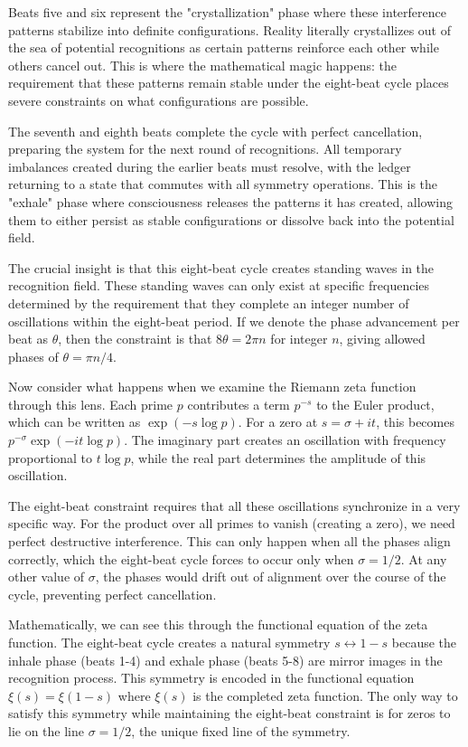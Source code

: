 \documentclass[12pt]{article}
\begin{document}
Beats five and six represent the "crystallization" phase where these interference patterns stabilize into definite configurations. Reality literally crystallizes out of the sea of potential recognitions as certain patterns reinforce each other while others cancel out. This is where the mathematical magic happens: the requirement that these patterns remain stable under the eight-beat cycle places severe constraints on what configurations are possible.

The seventh and eighth beats complete the cycle with perfect cancellation, preparing the system for the next round of recognitions. All temporary imbalances created during the earlier beats must resolve, with the ledger returning to a state that commutes with all symmetry operations. This is the "exhale" phase where consciousness releases the patterns it has created, allowing them to either persist as stable configurations or dissolve back into the potential field.

The crucial insight is that this eight-beat cycle creates standing waves in the recognition field. These standing waves can only exist at specific frequencies determined by the requirement that they complete an integer number of oscillations within the eight-beat period. If we denote the phase advancement per beat as $\theta$, then the constraint is that $8\theta = 2\pi n$ for integer $n$, giving allowed phases of $\theta = \pi n/4$.

Now consider what happens when we examine the Riemann zeta function through this lens. Each prime $p$ contributes a term $p^{-s}$ to the Euler product, which can be written as $\exp(-s \log p)$. For a zero at $s = \sigma + it$, this becomes $p^{-\sigma} \exp(-it \log p)$. The imaginary part creates an oscillation with frequency proportional to $t \log p$, while the real part determines the amplitude of this oscillation.

The eight-beat constraint requires that all these oscillations synchronize in a very specific way. For the product over all primes to vanish (creating a zero), we need perfect destructive interference. This can only happen when all the phases align correctly, which the eight-beat cycle forces to occur only when $\sigma = 1/2$. At any other value of $\sigma$, the phases would drift out of alignment over the course of the cycle, preventing perfect cancellation.

Mathematically, we can see this through the functional equation of the zeta function. The eight-beat cycle creates a natural symmetry $s \leftrightarrow 1-s$ because the inhale phase (beats 1-4) and exhale phase (beats 5-8) are mirror images in the recognition process. This symmetry is encoded in the functional equation $\xi(s) = \xi(1-s)$ where $\xi(s)$ is the completed zeta function. The only way to satisfy this symmetry while maintaining the eight-beat constraint is for zeros to lie on the line $\sigma = 1/2$, the unique fixed line of the symmetry.
\end{document}
